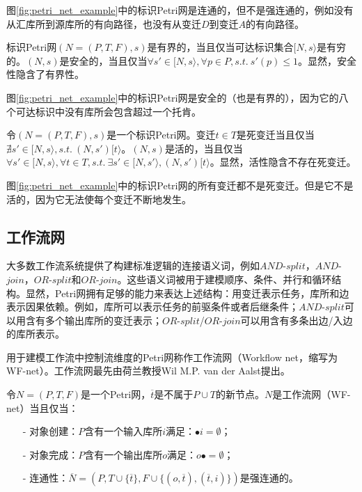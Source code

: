 图\ref{fig:petri_net_example}中的标识Petri网是连通的，但不是强连通的，例如没有从汇库所到源库所的有向路径，也没有从变迁$D$到变迁$A$的有向路径。

\begin{definition}\label{def:boundedness_safeness}
标识Petri网$(N=(P,T,F),s)$是有界的，当且仅当可达标识集合$[N,s\rangle$是有穷的。$(N,s)$是安全的，当且仅当$\forall s'\in[N,s\rangle,\forall p\in P,s.t.~s'(p)\leq 1$。显然，安全性隐含了有界性。
\end{definition}

图\ref{fig:petri_net_example}中的标识Petri网是安全的（也是有界的），因为它的八个可达标识中没有库所会包含超过一个托肯。

\begin{definition}[死变迁，活性]\label{def:dead_transition}
令$(N=(P,T,F),s)$是一个标识Petri网。变迁$t\in T$是死变迁当且仅当$\nexists s'\in[N,s\rangle,s.t.~(N,s')[t\rangle$。$(N,s)$是活的，当且仅当$\forall s'\in[N,s\rangle,\forall t\in T,s.t.~\exists s'\in[N,s'\rangle,(N,s')[t\rangle$。显然，活性隐含不存在死变迁。
\end{definition}

图\ref{fig:petri_net_example}中的标识Petri网的所有变迁都不是死变迁。但是它不是活的，因为它无法使每个变迁不断地发生。

\subsection{工作流网}\label{subsec:workflow_net}
大多数工作流系统提供了构建标准逻辑的连接语义词，例如$AND$-$split$，$AND$-$join$，$OR$-$split$和$OR$-$join$\cite{van2004workflowbook,fischer2002workflow,jablonski1996workflow,leymann2000production}。这些语义词被用于建模顺序、条件、并行和循环结构\cite{fischer2002workflow}。显然，Petri网拥有足够的能力来表达上述结构：用变迁表示任务，库所和边表示因果依赖。例如，库所可以表示任务的前驱条件或者后继条件；$AND$-$split$可以用含有多个输出库所的变迁表示；$OR$-$split$/$OR$-$join$可以用含有多条出边/入边的库所表示。

用于建模工作流中控制流维度的Petri网称作工作流网（Workflow net，缩写为WF-net）。工作流网最先由荷兰教授Wil M.P. van der Aalst提出\cite{van1998application}。

\begin{definition}[工作流网]\label{def:workflow_net}
令$N=(P,T,F)$是一个Petri网，$\overline{t}$是不属于$P\cup T$的新节点。$N$是工作流网（WF-net）当且仅当：
  \begin{itemize}
  	\item[-] 对象创建：$P$含有一个输入库所$i$满足：$\bullet i=\emptyset$；
  	\item[-] 对象完成：$P$含有一个输出库所$o$满足：$o\bullet=\emptyset$；
  	\item[-] 连通性：$\overline{N}=(P,T\cup\{\overline{t}\},F\cup\{(o,\overline{t}),(\overline{t},i)\})$是强连通的。
  \end{itemize}
\end{definition}

